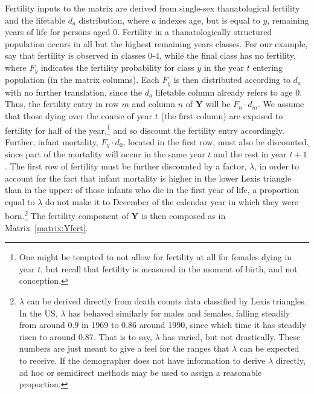 \documentclass{article}
\begin{document}
 Fertility inputs to the matrix are derived from single-sex thanatological
 fertility and the lifetable $d_a$ distribution, where $a$ indexes age, but is
 equal to $y$, remaining years of life for persons aged 0. Fertility
 in a thanatologically structured population occurs in all but the highest
 remaining years classes. For our example, say that fertility is observed in
 classes 0-4, while the final class has no fertility, where $F_y$ indicates the
 fertility probability for class $y$ in the year $t$ entering population (in the 
 matrix columns). Each $F_y$ is then distributed according to
 $d_a$ with no further translation, since the $d_a$ lifetable column already
 refers to age 0. Thus, the fertility entry in row $m$ and column $n$ of
 $\textbf{Y}$ will be $F_n \cdot d_m$. We assume that those dying over the course of year
 $t$ (the first column) are exposed to fertility for half of the
 year,\footnote{One might be tempted to not allow for fertility at all for
 females dying in year $t$, but recall that fertility is measured in the moment of
 birth, and not conception.}
 and so discount the fertility entry accordingly. Further, infant mortality, 
 $F_y \cdot d_0$, located in the first row, must also be discounted, since part
 of the mortality will occur in the same year $t$ and the rest in year $t + 1$. 
 The first row of fertility must be further discounted by a factor, $\lambda$,
 in order to account for the fact that infant mortality is higher in the lower Lexis 
 triangle than in the upper: of those infants who die in the first year of life, a proportion equal to
 $\lambda$ do not make it to December  of the calendar year in which
 they were born.\footnote{$\lambda$ can be derived directly from death counts
 data classified by Lexis triangles. In the US, $\lambda$ has behaved similarly
 for males and females, falling steadily from around $0.9$ in 1969 to $0.86$
 around 1990, since which time it has steadily risen to around $0.87$. That is
 to say, $\lambda$ has varied, but not drastically. These numbers are just meant to give a
feel for the ranges that $\lambda$ can be expected to receive. If the demographer
 does not have information to derive $\lambda$ directly, ad hoc or semidirect
 methods may be used to assign a reasonable proportion. } The
 fertility component of $\textbf{Y}$ is then composed as in Matrix~\ref{matrix:Yfert}.
\end{document}
